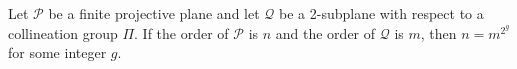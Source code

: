 Let $\mathcal{P}$ be a finite projective plane and let $\mathcal{Q}$ be a 2-subplane with respect to a collineation group $\Pi$. If the order of $\mathcal{P}$ is $n$ and the order of $\mathcal{Q}$ is $m$, then $n = m^{2^g}$ for some integer $g$.
